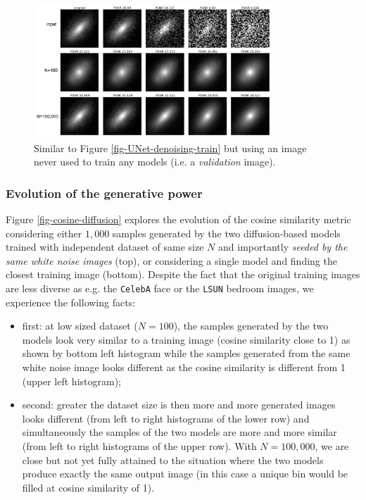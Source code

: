 \documentclass[11pt]{amsart}
\begin{document}
\begin{figure}
    \centering
	\includegraphics[width=0.8\textwidth]{fig-UNet_denoising_test.pdf}
	\caption{Similar to  Figure \ref{fig-UNet-denoising-train} but  using an image never used to train any models (i.e. a \textit{validation} image). }
	\label{fig-UNet-denoising-test}
\end{figure}
%
\subsubsection{Evolution of the generative power}
Figure \ref{fig-cosine-diffusion} explores the evolution of the cosine similarity metric \citep{books/aw/TanSK2005} considering either $1,000$ samples generated by the two diffusion-based models trained with independent dataset of same size $N$ and importantly \textit{seeded by the same white noise images} (top), or considering a single model and finding the closest training image (bottom). Despite the fact that the original training images are less diverse as e.g. the \texttt{CelebA} face or the \texttt{LSUN} bedroom images, we experience the following facts: 
\begin{itemize}
\item first: at low sized dataset ($N=100$), the samples generated by the two models look very similar to a training image (cosine similarity close to 1) as shown by bottom left histogram while the samples generated from the same white noise image looks different as the cosine similarity is different from 1 (upper left histogram);
\item second: greater the dataset size is then more and more generated images looks different (from left to right histograms of the lower row) and simultaneously the samples of the two models are more and more similar (from left to right histograms of the upper row). With $N=100,000$, we are close but not yet fully attained to the situation where the two models produce exactly the same output image (in this case a unique bin would be filled at cosine similarity of 1). 
\end{itemize}
\end{document}
